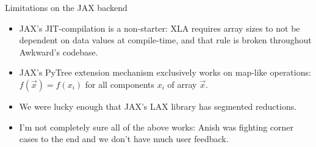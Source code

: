 \documentclass[aspectratio=169]{beamer}
\begin{document}
\begin{frame}{Limitations on the JAX backend}
\large
\vspace{0.5 cm}
\begin{itemize}\setlength{\itemsep}{0.5 cm}
\item<1-> JAX's JIT-compilation is a non-starter: XLA requires array sizes to not be dependent on data values at compile-time, and that rule is broken throughout Awkward's codebase.
\item<2-> JAX's PyTree extension mechanism exclusively works on map-like operations: $f(\vec{x}) = f(x_i)$ for all components $x_i$ of array $\vec{x}$.
\item<3-> We were lucky enough that JAX's LAX library has segmented reductions.
\item<4-> I'm not completely sure all of the above works: Anish was fighting corner cases to the end and we don't have much user feedback.
\end{itemize}
\end{frame}
\end{document}
